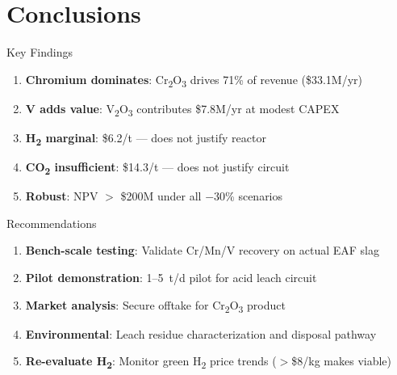 \documentclass[aspectratio=169]{beamer}
\begin{document}
\section{Conclusions}

\begin{frame}{Key Findings}
\begin{enumerate}
\item \textbf{Chromium dominates}: Cr\textsubscript{2}O\textsubscript{3}
      drives 71\% of revenue (\$33.1M/yr)
\item \textbf{V adds value}: V\textsubscript{2}O\textsubscript{3}
      contributes \$7.8M/yr at modest CAPEX
\item \textbf{H\textsubscript{2} marginal}: \$6.2/t --- does not justify reactor
\item \textbf{CO\textsubscript{2} insufficient}: \$14.3/t --- does not justify circuit
\item \textbf{Robust}: NPV $>$ \$200M under all $-$30\% scenarios
\end{enumerate}
\end{frame}

\begin{frame}{Recommendations}
\begin{enumerate}
\item \textbf{Bench-scale testing}: Validate Cr/Mn/V recovery on actual EAF slag
\item \textbf{Pilot demonstration}: 1--5~t/d pilot for acid leach circuit
\item \textbf{Market analysis}: Secure offtake for Cr\textsubscript{2}O\textsubscript{3} product
\item \textbf{Environmental}: Leach residue characterization and disposal pathway
\item \textbf{Re-evaluate H\textsubscript{2}}: Monitor green H\textsubscript{2} price trends ($>$\$8/kg makes viable)
\end{enumerate}
\end{frame}

\closingSlide
\end{document}
